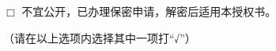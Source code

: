 \(\Box\)  不宜公开，已办理保密申请，解密后适用本授权书。

（请在以上选项内选择其中一项打“√”）

\vspace{2cm}

\noindent\begin{minipage}{0.45\textwidth}
\begin{flushleft}
\makebox[0.2\textwidth][l]{\underline{\hspace{0.6\textwidth}}} \\
\makebox[0.2\textwidth][l]{\underline{\hspace{0.6\textwidth}}} \\
\end{flushleft}
\end{minipage}
\hfill
\begin{minipage}{0.45\textwidth}
\begin{flushright}
\makebox[0.6\textwidth][l]{\underline{\hspace{0.6\textwidth}}} \\
\makebox[0.6\textwidth][l]{\underline{\hspace{0.6\textwidth}}}
\end{flushright}
\end{minipage}